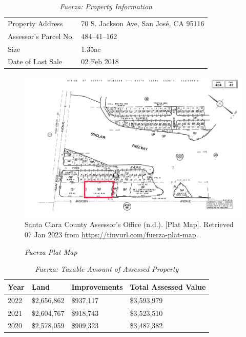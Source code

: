 \begin{table}[htbp]
  \SingleSpacing%
  \caption[Fuerza: Property Information]{\textit{Fuerza: Property Information}}\label{tab:fuerza-prop-info}
  \begin{tabular}{ll}
    \toprule
    Property Address      & 70 S. Jackson Ave, San José, CA 95116 \\
    Assessor's Parcel No. & 484–41–162 \\
    Size                  & 1.35ac \\
    Date of Last Sale     & 02 Feb 2018 \\
    \bottomrule
  \end{tabular}
\end{table}

\begin{figure}[hbtp]
    \caption[Fuerza Plat Map]{\textit{Fuerza Plat Map}}\label{fig:fuerza-plat-map}
    \includegraphics[width=\textwidth]{Assessor-Info/fuerza-plat-map-484-41}\\ %
    \footnotesize{Santa Clara County Assessor's Office (n.d.). [Plat Map]. Retrieved 07 Jan 2023 from  \url{https://tinyurl.com/fuerza-plat-map}}.
\end{figure}

\begin{table}[hbtp]
  \SingleSpacing%
  \caption[Fuerza: Taxable Amount of Assessed Propery]{\textit{Fuerza: Taxable Amount of Assessed Property}}\label{tab:fuerza-taxable-amount}
  \begin{tabular}{llll}
    \toprule
    Year & Land        & Improvements & Total Assessed Value \\
    \midrule
    2022 & \$2,656,862 & \$937,117    & \$3,593,979 \\
    2021 & \$2,604,767 & \$918,743    & \$3,523,510 \\
    2020 & \$2,578,059 & \$909,323    & \$3,487,382 \\
    \bottomrule
  \end{tabular}
\end{table}

